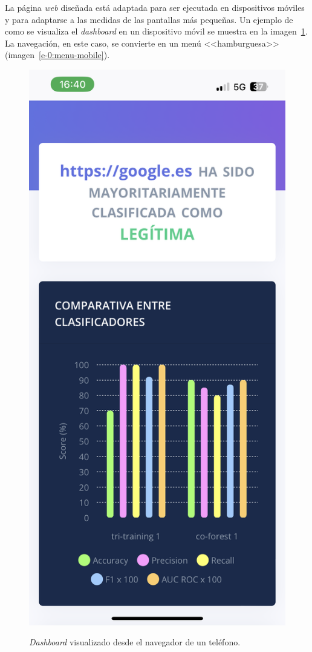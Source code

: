 La página \textit{web} diseñada está adaptada para ser ejecutada en dispositivos móviles y para adaptarse a las medidas de las pantallas más pequeñas. Un ejemplo de como se visualiza el \textit{dashboard} en un dispositivo móvil se muestra en la imagen~\ref{e-0:dashboard-mobile}. La navegación, en este caso, se convierte en un menú <<hamburguesa>> (imagen~\ref{e-0:menu-mobile}).

\begin{figure}[h]
	\caption[Manual de usuario: \textit{dashboard} (versión móvil)]{\textit{Dashboard} visualizado desde el navegador de un teléfono.}
	\centering
	\includegraphics[scale=0.1]{../img/anexos/user_guide/0_dashboard_mobile}
	\label{e-0:dashboard-mobile}
\end{figure}

